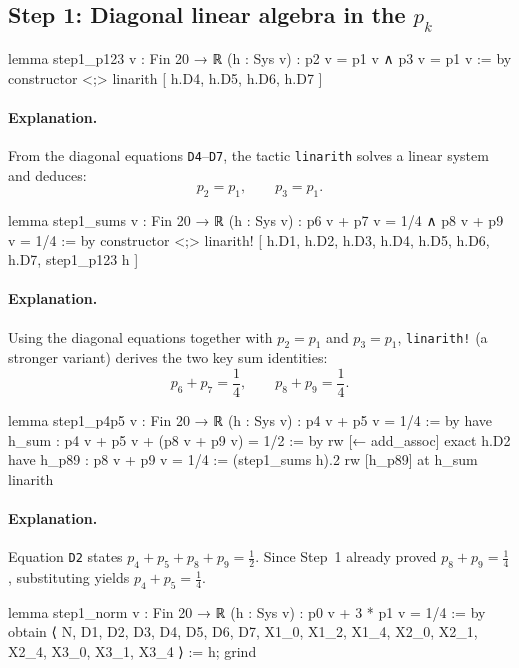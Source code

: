 \documentclass[11pt]{article}
\begin{document}
\subsection*{Step 1: Diagonal linear algebra in the $p_k$}

\begin{LeanCode}
lemma step1_p123 {v : Fin 20 → ℝ} (h : Sys v) : p2 v = p1 v ∧ p3 v = p1 v := by
  constructor <;> linarith [ h.D4, h.D5, h.D6, h.D7 ]
\end{LeanCode}

\paragraph{Explanation.}
From the diagonal equations \texttt{D4}--\texttt{D7}, the tactic \texttt{linarith} solves a linear system and deduces:
\[
p_2=p_1,\qquad p_3=p_1.
\]

\begin{LeanCode}
lemma step1_sums {v : Fin 20 → ℝ} (h : Sys v) : p6 v + p7 v = 1/4 ∧ p8 v + p9 v = 1/4 := by
  constructor <;> linarith! [ h.D1, h.D2, h.D3, h.D4, h.D5, h.D6, h.D7, step1_p123 h ]
\end{LeanCode}

\paragraph{Explanation.}
Using the diagonal equations together with $p_2=p_1$ and $p_3=p_1$, \texttt{linarith!} (a stronger variant) derives the two key sum identities:
\[
p_6+p_7=\frac14,\qquad p_8+p_9=\frac14.
\]

\begin{LeanCode}
lemma step1_p4p5 {v : Fin 20 → ℝ} (h : Sys v) : p4 v + p5 v = 1/4 := by
  have h_sum : p4 v + p5 v + (p8 v + p9 v) = 1/2 := by
    rw [← add_assoc]
    exact h.D2
  have h_p89 : p8 v + p9 v = 1/4 := (step1_sums h).2
  rw [h_p89] at h_sum
  linarith
\end{LeanCode}

\paragraph{Explanation.}
Equation \texttt{D2} states $p_4+p_5+p_8+p_9=\frac12$.
Since Step~1 already proved $p_8+p_9=\frac14$, substituting yields $p_4+p_5=\frac14$.

\begin{LeanCode}
lemma step1_norm {v : Fin 20 → ℝ} (h : Sys v) : p0 v + 3 * p1 v = 1/4 := by
  obtain ⟨ N, D1, D2, D3, D4, D5, D6, D7, X1_0, X1_2, X1_4, X2_0, X2_1, X2_4, X3_0, X3_1, X3_4 ⟩ := h;
  grind
\end{LeanCode}
\end{document}
